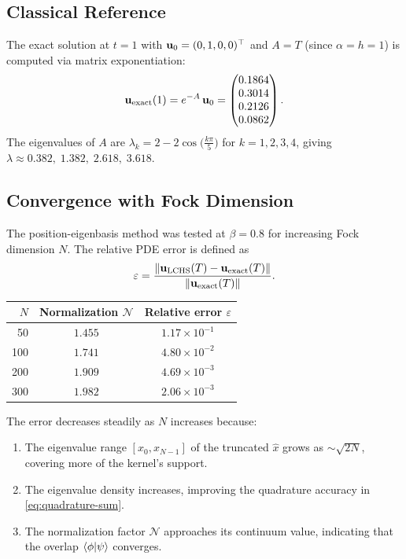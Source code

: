 \documentclass[11pt]{article}
\begin{document}
\subsection{Classical Reference}

The exact solution at $t=1$ with $\vb{u}_0 = (0,1,0,0)^\top$ and
$A = T$ (since $\alpha = h = 1$) is computed via matrix exponentiation:
\begin{equation}
  \vb{u}_{\mathrm{exact}}(1) = e^{-A}\,\vb{u}_0
  = \begin{pmatrix} 0.1864 \\ 0.3014 \\ 0.2126 \\ 0.0862 \end{pmatrix}.
\end{equation}
The eigenvalues of $A$ are
$\lambda_k = 2 - 2\cos\!\bigl(\frac{k\pi}{5}\bigr)$ for $k=1,2,3,4$,
giving $\lambda \approx 0.382,\; 1.382,\; 2.618,\; 3.618$.

\subsection{Convergence with Fock Dimension}

The position-eigenbasis method was tested at $\beta = 0.8$ for increasing
Fock dimension $N$.  The relative PDE error is defined as
\begin{equation}
  \varepsilon = \frac{\norm{\vb{u}_{\mathrm{LCHS}}(T) - \vb{u}_{\mathrm{exact}}(T)}}
                     {\norm{\vb{u}_{\mathrm{exact}}(T)}}.
\end{equation}

\begin{center}
\begin{tabular}{rcc}
  \toprule
  $N$ & Normalization $\mathcal{N}$ & Relative error $\varepsilon$ \\
  \midrule
  50  & $1.455$ & $1.17 \times 10^{-1}$ \\
  100 & $1.741$ & $4.80 \times 10^{-2}$ \\
  200 & $1.909$ & $4.69 \times 10^{-3}$ \\
  300 & $1.982$ & $2.06 \times 10^{-3}$ \\
  \bottomrule
\end{tabular}
\end{center}

The error decreases steadily as $N$ increases because:
\begin{enumerate}
  \item The eigenvalue range $[x_0, x_{N-1}]$ of the truncated $\hat{x}$ grows
        as $\sim \sqrt{2N}$, covering more of the kernel's support.
  \item The eigenvalue density increases, improving the quadrature accuracy
        in \cref{eq:quadrature-sum}.
  \item The normalization factor $\mathcal{N}$ approaches its continuum value,
        indicating that the overlap $\braket{\phi}{\psi}$ converges.
\end{enumerate}
\end{document}
